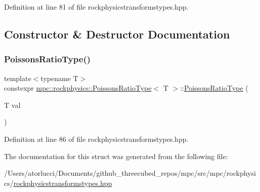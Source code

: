 Definition at line 81 of file rockphysicstransformstypes.\+hpp.



\subsection{Constructor \& Destructor Documentation}
\mbox{\label{structmpc_1_1rockphysics_1_1_poissons_ratio_type_adfd93825fc8410288ea9078dfce8bb47}} 
\subsubsection{\texorpdfstring{Poissons\+Ratio\+Type()}{PoissonsRatioType()}}
{\footnotesize\ttfamily template$<$typename T$>$ \\
constexpr \mbox{\hyperlink{structmpc_1_1rockphysics_1_1_poissons_ratio_type}{mpc\+::rockphysics\+::\+Poissons\+Ratio\+Type}}$<$ T $>$\+::\mbox{\hyperlink{structmpc_1_1rockphysics_1_1_poissons_ratio_type}{Poissons\+Ratio\+Type}} (\begin{DoxyParamCaption}\item[{T}]{val }\end{DoxyParamCaption})\hspace{0.3cm}{\ttfamily [inline]}}



Definition at line 86 of file rockphysicstransformstypes.\+hpp.



The documentation for this struct was generated from the following file\+:\begin{DoxyCompactItemize}
\item 
/\+Users/atorlucci/\+Documents/github\+\_\+threecubed\+\_\+repos/mpc/src/mpc/rockphysics/\mbox{\hyperlink{rockphysicstransformstypes_8hpp}{rockphysicstransformstypes.\+hpp}}\end{DoxyCompactItemize}
